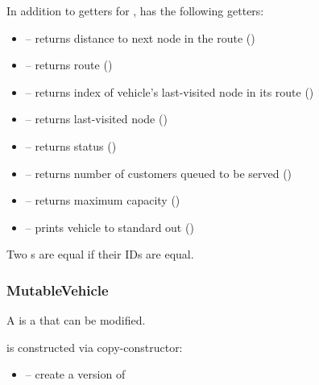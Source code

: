  In addition to getters for ,  has the
following getters:
\begin{itemize}
    \item[]  -- returns distance to next node in the route ()
    \item[]  -- returns route ()
    \item[]  -- returns index of vehicle's last-visited node in its route ()
    \item[]  -- returns last-visited node ()
    \item[]  -- returns status ()
    \item[]  -- returns number of customers queued to be served ()
    \item[]  -- returns maximum capacity ()
    \item[]  -- prints vehicle to standard out ()
\end{itemize}


Two s are equal if their IDs are equal.

\subsubsection{MutableVehicle}

A  is a  that can be modified.

  is constructed via copy-constructor:
\begin{itemize}
    \item[]  -- create a  version of 
\end{itemize}

